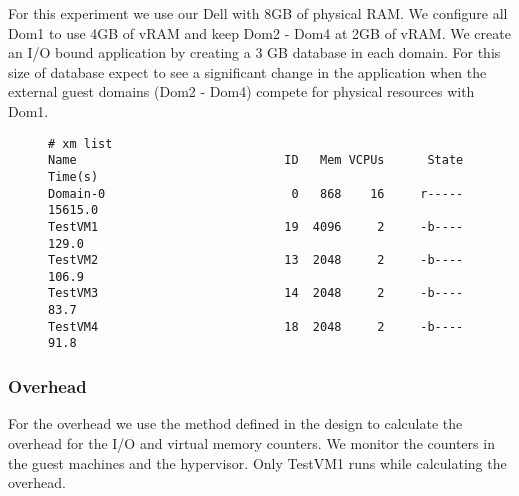 \indent For this experiment we use our Dell with 8GB of physical RAM.  
We configure all Dom1 to use 4GB of vRAM and keep Dom2 - Dom4 at 2GB of vRAM.  We create an I/O bound application by creating a 3 GB database in each domain.  For this size of database expect to see a significant change in the application when the external guest domains (Dom2 - Dom4) compete for physical resources with Dom1.

\begin{figure}[h]
\begin{Verbatim}
# xm list
Name                             ID   Mem VCPUs      State   Time(s)
Domain-0                          0   868    16     r-----  15615.0
TestVM1                          19  4096     2     -b----    129.0
TestVM2                          13  2048     2     -b----    106.9
TestVM3                          14  2048     2     -b----     83.7
TestVM4                          18  2048     2     -b----     91.8
\end{Verbatim}
\end{figure}

\subsubsection{Overhead}
For the overhead we use the method defined in the design to calculate the overhead for the I/O and virtual memory counters.  We monitor the counters in the guest machines and the hypervisor.  Only TestVM1 runs while calculating the overhead.

